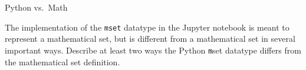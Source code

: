 \documentclass[11pt]{article}
\begin{document}
\setcounter{problem}{5} %

\begin{problem} Python vs.\ Math\end{problem}

The implementation of the {\tt mset} datatype in the Jupyter notebook is meant to represent a mathematical set, but is different from a mathematical set in several important ways. Describe at least two ways the Python {\texttt mset} datatype differs from the mathematical set definition.
\end{document}
